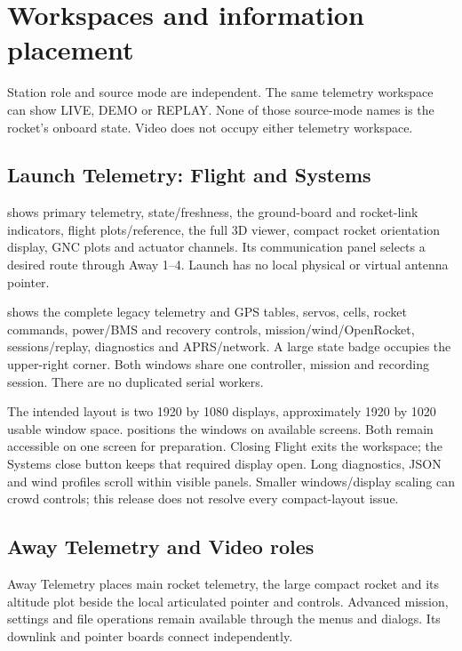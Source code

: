 \section{Workspaces and information placement}\label{sec:workspaces}
Station role and source mode are independent. The same telemetry workspace can
show LIVE, DEMO or REPLAY. None of those source-mode names is the rocket's
onboard state. Video does not occupy either telemetry workspace.



\subsection{Launch Telemetry: Flight and Systems}
 shows primary telemetry, state/freshness, the ground-board and
rocket-link indicators, flight plots/reference, the full 3D viewer, compact
rocket orientation display, GNC plots and actuator channels. Its communication
panel selects a desired route through Away 1--4. Launch has no local physical
or virtual antenna pointer.

 shows the complete legacy telemetry and GPS tables, servos, cells,
rocket commands, power/BMS and recovery controls, mission/wind/OpenRocket,
sessions/replay, diagnostics and APRS/network. A large state badge occupies the
upper-right corner. Both windows share one controller, mission and recording
session. There are no duplicated serial workers.

The intended layout is two 1920 by 1080 displays, approximately 1920 by 1020
usable window space.  positions the
windows on available screens. Both remain accessible on one screen for
preparation. Closing Flight exits the workspace; the Systems close button
keeps that required display open. Long diagnostics, JSON and wind profiles
scroll within visible panels. Smaller windows/display scaling can crowd
controls; this release does not resolve every compact-layout issue.

\subsection{Away Telemetry and Video roles}
Away Telemetry places main rocket telemetry, the large compact rocket and its
altitude plot beside the local articulated pointer and controls. Advanced
mission, settings and file operations remain available through the menus and
dialogs. Its downlink and pointer boards connect independently.


